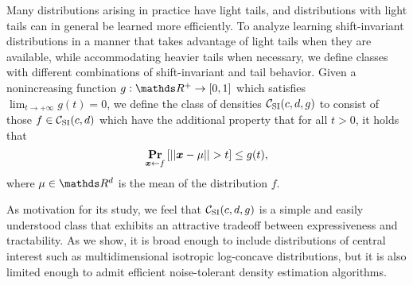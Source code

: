 
Many distributions arising in practice have light tails, and distributions with light
tails can in general be learned more efficiently.  To analyze learning shift-invariant distributions
in a manner that takes advantage of light tails when they are available, while accommodating heavier tails
when necessary, we define classes with different combinations of shift-invariant and tail behavior.
%  
Given a nonincreasing function $g: \R^+ \to [0,1]$ which satisfies $\lim_{t \to +\infty} g(t) = 0$, we define the class of densities ${\mathcal C}_{\mathrm{SI}}(c,d,g)$ to consist of those $f \in {\mathcal C}_{\mathrm{SI}}(c,d)$ which have the additional property that for all $t > 0$, it holds that 
\[
\mathop{{\bf Pr}\/}_{\boldsymbol{x} \leftarrow f}\left[|| \boldsymbol{x} - \mu || > t \right] \leq g(t),
\]
where $\mu \in \R^d$ is the mean of the distribution $f.$  

As motivation for its study, we feel that  ${\mathcal C}_{\mathrm{SI}}(c,d,g)$ is a simple and easily understood class that exhibits an attractive tradeoff between expressiveness and tractability.  As we show, it is broad enough to include distributions of central interest such as multidimensional isotropic log-concave distributions, but it is also limited enough to admit efficient noise-tolerant density estimation algorithms.

